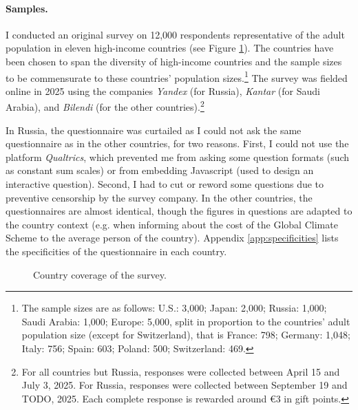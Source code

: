 \documentclass[12pt,english]{article}
\begin{document}
\begin{bibunit}
\paragraph{Samples.}
I conducted an original survey on 12,000 respondents representative of the adult population in eleven high-income countries (see Figure \ref{fig:country_coverage}). The countries have been chosen to span the diversity of high-income countries and the sample sizes to be commensurate to these countries' population sizes.\footnote{The sample sizes are as follows: U.S.: 3,000; Japan: 2,000; Russia: 1,000; Saudi Arabia: 1,000; Europe: 5,000, split in proportion to the countries' adult population size (except for Switzerland), that is France: 798; Germany: 1,048; Italy: 756; Spain: 603; Poland: 500; Switzerland: 469.} 
The survey was fielded online in 2025 using the companies \textit{Yandex} (for Russia), \textit{Kantar} (for Saudi Arabia), and \textit{Bilendi} (for the other countries).\footnote{For all countries but Russia, responses were collected between April 15 and July 3, 2025. For Russia, responses were collected between September 19 and TODO, 2025. Each complete response is rewarded around \euro{}3 in gift points.} 

In Russia, the questionnaire was curtailed as I could not ask the same questionnaire as in the other countries, for two reasons. First, I could not use the platform \textit{Qualtrics}, which prevented me from asking some question formats (such as constant sum scales) or from embedding Javascript (used to design an interactive question). Second, I had to cut or reword some questions due to preventive censorship by the survey company. In the other countries, the questionnaires are almost identical, though the figures in questions are adapted to the country context (e.g. when informing about the cost of the Global Climate Scheme to the average person of the country). Appendix \ref{app:specificities} lists the specificities of the questionnaire in each country.

\begin{figure}[h!]
    \caption[Country coverage]{Country coverage of the survey.
    }\label{fig:country_coverage}
\end{figure}


\end{bibunit}
\end{document}
